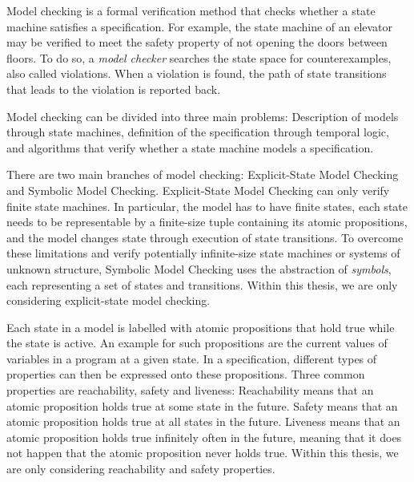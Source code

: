 \documentclass[
fancyheadings, %
%
%
]{stsreprt}
\begin{document}
Model checking is a formal verification method that checks whether a state machine satisfies a specification.
For example, the state machine of an elevator may be verified to meet the safety property of not opening the doors between floors.
To do so, a \emph{model checker} searches the state space for counterexamples, also called violations.
When a violation is found, the path of state transitions that leads to the violation is reported back.

Model checking can be divided into three main problems:
Description of models through state machines, definition of the specification through temporal logic, and algorithms that verify whether a state machine models a specification.

There are two main branches of model checking:
Explicit-State Model Checking and Symbolic Model Checking.
Explicit-State Model Checking can only verify finite state machines.
In particular, the model has to have finite states, each state needs to be representable by a finite-size tuple containing its atomic propositions, and the model changes state through execution of state transitions.
To overcome these limitations and verify potentially infinite-size state machines or systems of unknown structure, Symbolic Model Checking uses the abstraction of \emph{symbols}, each representing a set of states and transitions.
Within this thesis, we are only considering explicit-state model checking.

Each state in a model is labelled with atomic propositions that hold true while the state is active.
An example for such propositions are the current values of variables in a program at a given state.
In a specification, different types of properties can then be expressed onto these propositions.
Three common properties are reachability, safety and liveness:
Reachability means that an atomic proposition holds true at some state in the future.
Safety means that an atomic proposition holds true at all states in the future.
Liveness means that an atomic proposition holds true infinitely often in the future, meaning that it does not happen that the atomic proposition never holds true.
Within this thesis, we are only considering reachability and safety properties.
\end{document}
